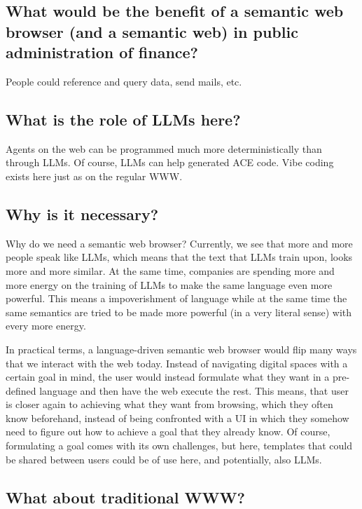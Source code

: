 \documentclass[12pt,a4paper]{article}
\begin{document}

\subsection{What would be the benefit of a semantic web browser (and a semantic web) in public administration of finance?}

People could reference and query data, send mails, etc.

\subsection{What is the role of LLMs here?}

Agents on the web can be programmed much more deterministically than through LLMs. Of course, LLMs can help generated ACE code. Vibe coding exists here just as on the regular WWW.

\subsection{Why is it necessary?}

Why do we need a semantic web browser? Currently, we see that more and more people speak like LLMs, which means that the text that LLMs train upon, looks more and more similar. At the same time, companies are spending more and more energy on the training of LLMs to make the same language even more powerful. This means a impoverishment of language while at the same time the same semantics are tried to be made more powerful (in a very literal sense) with every more energy.

In practical terms, a language-driven semantic web browser would flip many ways that we interact with the web today. Instead of navigating digital spaces with a certain goal in mind, the user would instead formulate what they want in a pre-defined language and then have the web execute the rest. This means, that user is closer again to achieving what they want from browsing, which they often know beforehand, instead of being confronted with a UI in which they somehow need to figure out how to achieve a goal that they already know. Of course, formulating a goal comes with its own challenges, but here, templates that could be shared between users could be of use here, and potentially, also LLMs.

\subsection{What about traditional WWW?}
\end{document}
